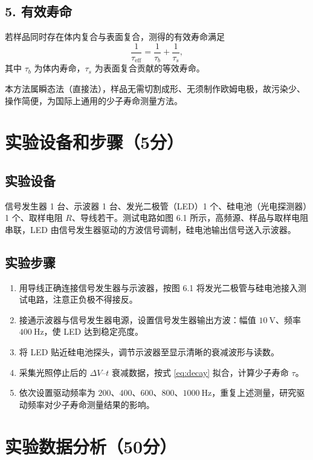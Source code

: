 \documentclass[12pt,a4paper]{ctexart}
\begin{document}
\subsection*{5. 有效寿命}
若样品同时存在体内复合与表面复合，测得的有效寿命满足
\begin{equation}
    \frac{1}{\tau_{\mathrm{eff}}} = \frac{1}{\tau_b} + \frac{1}{\tau_s},
\end{equation}
其中 $\tau_b$ 为体内寿命，$\tau_s$ 为表面复合贡献的等效寿命。

本方法属瞬态法（直接法），样品无需切割成形、无须制作欧姆电极，故污染少、操作简便，为国际上通用的少子寿命测量方法。

\section*{实验设备和步骤（5分）}

\subsection*{实验设备}
信号发生器 1 台、示波器 1 台、发光二极管（LED）1 个、硅电池（光电探测器）1 个、取样电阻 $R$、导线若干。测试电路如图 6.1 所示，高频源、样品与取样电阻串联，LED 由信号发生器驱动的方波信号调制，硅电池输出信号送入示波器。

\subsection*{实验步骤}
\begin{enumerate}
    \item 用导线正确连接信号发生器与示波器，按图 6.1 将发光二极管与硅电池接入测试电路，注意正负极不得接反。
    \item 接通示波器与信号发生器电源，设置信号发生器输出方波：幅值 $10\ \mathrm{V}$、频率 $400\ \mathrm{Hz}$，使 LED 达到稳定亮度。
    \item 将 LED 贴近硅电池探头，调节示波器至显示清晰的衰减波形与读数。
    \item 采集光照停止后的 $\Delta V$--$t$ 衰减数据，按式 \eqref{eq:decay} 拟合，计算少子寿命 $\tau$。
    \item 依次设置驱动频率为 $200$、$400$、$600$、$800$、$1000\ \mathrm{Hz}$，重复上述测量，研究驱动频率对少子寿命测量结果的影响。
\end{enumerate}

\section*{实验数据分析（50分）}
\end{document}
